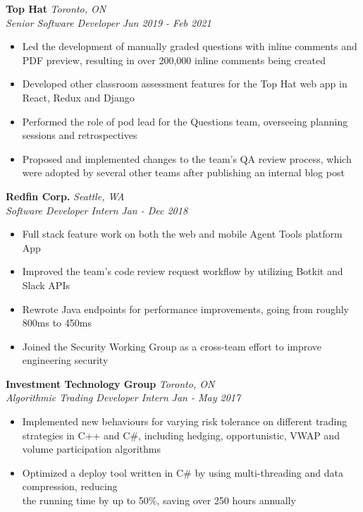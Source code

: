 \documentclass[a4paper,11pt]{article}
\begin{document}
\textbf{Top Hat} \hspace*{\fill} \emph{Toronto, ON} \\
\emph{Senior Software Developer} \hspace*{\fill} \emph{Jun 2019 - Feb 2021}
\begin{itemize}[noitemsep, topsep=-1ex]
\item Led the development of manually graded questions with inline comments and PDF preview, resulting in over 200,000 inline comments being created
\item Developed other classroom assessment features for the Top Hat web app in React, Redux and Django
\item Performed the role of pod lead for the Questions team, overseeing planning sessions and retrospectives
\item Proposed and implemented changes to the team's QA review process, which were adopted by several other teams after publishing an internal blog post
\end{itemize}

 \textbf{Redfin Corp.} \hspace*{\fill}  \emph{Seattle, WA}  \\
\emph{Software Developer Intern} \hspace*{\fill}  \emph{Jan - Dec 2018}
 	\begin{itemize}[noitemsep, topsep=-1ex]
	
	\item Full stack feature work on both the web and mobile Agent Tools platform App
	\item Improved the team's code review request workflow by utilizing Botkit and Slack APIs
	\item Rewrote Java endpoints for performance improvements, going from roughly 800ms to 450ms
	\item Joined the Security Working Group as a cross-team effort to improve engineering security
	\end{itemize}
\textbf{Investment Technology Group} \hspace*{\fill} \emph{Toronto, ON} \\
 \emph{Algorithmic Trading Developer Intern}  \hspace*{\fill} \emph{Jan - May 2017} 
 	\begin{itemize}[noitemsep, topsep=-1ex]
	\item Implemented new behaviours for varying risk tolerance on different trading strategies in C++ and C\#, including hedging, opportunistic, VWAP and volume participation algorithms
    \item Optimized a deploy tool written in C\# by using multi-threading and data compression, reducing \\ the running time by up to 50\%, saving over 250 hours annually
	\end{itemize}
  
\end{document}
